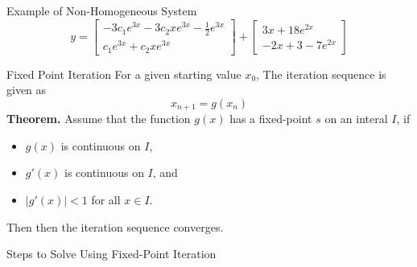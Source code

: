 \documentclass{article}
\begin{document}
\begin{multicols*}{3}
\begin{blackbox}{Example of Non-Homogeneous System}
{        \[
            y = \begin{bmatrix}
                -3c_1e^{3x} - 3c_2xe^{3x} - \frac{1}{2}e^{3x}\\
                c_1e^{3x} + c_2xe^{3x}
            \end{bmatrix}
            + \begin{bmatrix}
                3x + 18e^{2x}\\
                -2x+3 - 7e^{2x}
            \end{bmatrix}
        \]
    }
\end{blackbox}
    \begin{blackbox}{Fixed Point Iteration}
        For a given starting value $x_0$, The iteration sequence is given as \\[-5ex]
        \[x_{n+1} = g(x_n)\]
        \textbf{Theorem.} Assume that the function $g(x)$ has a fixed-point $s$ on an interal $I$, if 
        \begin{itemize}
            \item $g(x)$ is continuous on $I$,
            \item $g'(x)$ is continuous on $I$, and
            \item $|g'(x)| < 1$ for all $x \in I$.
        \end{itemize}
        Then then the iteration sequence converges.
        \begin{redbox}{Steps to Solve Using Fixed-Point Iteration}
           

\end{redbox}
\end{blackbox}
\end{multicols*}
\end{document}
